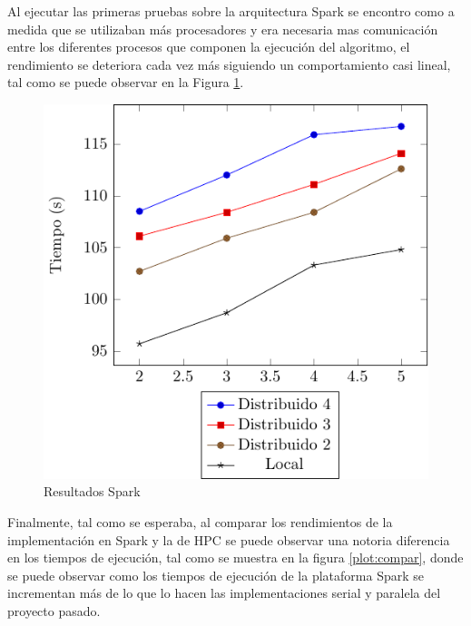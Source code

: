 \documentclass[conference,compsoc]{IEEEtran}
\begin{document}
Al ejecutar las primeras pruebas sobre la arquitectura Spark se encontro como
a medida que se utilizaban más procesadores y era necesaria mas comunicación entre
los diferentes procesos que componen la ejecución del algoritmo, el rendimiento se
deteriora cada vez más siguiendo un comportamiento casi lineal, tal como se puede
observar en la Figura \ref{plot:spark}.

\begin{figure}[H]
    \centering
    \includegraphics[scale=1]{ResultsSpark.pdf}
    \caption{Resultados Spark}
    \label{plot:spark}
\end{figure}

Finalmente, tal como se esperaba, al comparar los rendimientos de la implementación
en Spark y la de HPC se puede observar una notoria diferencia en los tiempos
de ejecución, tal como se muestra en la figura \ref{plot:compar}, donde se puede
observar como los tiempos de ejecución de la plataforma Spark se incrementan más
de lo que lo hacen las implementaciones serial y paralela del proyecto pasado.
\end{document}
